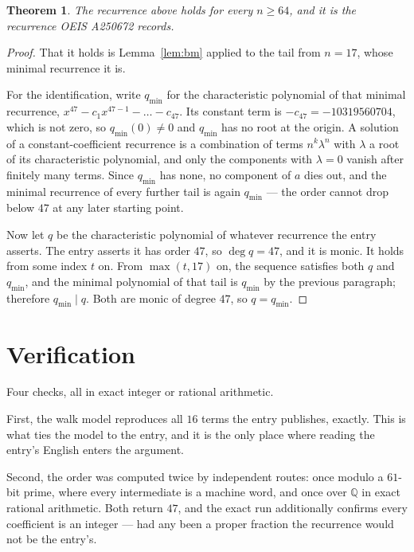 \documentclass[11pt,a4paper]{article}
\theoremstyle{plain}
\newtheorem{theorem}{Theorem}
\theoremstyle{definition}
\begin{document}
\begin{theorem}
The recurrence above holds for every $n\ge64$, and it is the recurrence OEIS A250672 records.
\end{theorem}

\begin{proof}
That it holds is Lemma~\ref{lem:bm} applied to the tail from $n=17$, whose minimal
recurrence it is.

For the identification, write $q_{\min}$ for the characteristic polynomial of that minimal
recurrence, $x^{47}-c_1x^{47-1}-\dots-c_{47}$. Its constant term is
$-c_{47}=-10319560704$, which is not zero, so $q_{\min}(0)\neq0$ and $q_{\min}$ has no
root at the origin. A solution of a constant-coefficient recurrence is a combination of terms
$n^{k}\lambda^{n}$ with $\lambda$ a root of its characteristic polynomial, and only the
components with $\lambda=0$ vanish after finitely many terms. Since $q_{\min}$ has none, no
component of $a$ dies out, and the minimal recurrence of every further tail is again
$q_{\min}$ --- the order cannot drop below $47$ at any later starting point.

Now let $q$ be the characteristic polynomial of whatever recurrence the entry asserts. The
entry asserts it has order $47$, so $\deg q=47$, and it is monic. It holds from some
index $t$ on. From $\max(t,17)$ on, the sequence satisfies both $q$ and $q_{\min}$, and
the minimal polynomial of that tail is $q_{\min}$ by the previous paragraph; therefore
$q_{\min}\mid q$. Both are monic of degree $47$, so $q=q_{\min}$.
\end{proof}

\section{Verification}

Four checks, all in exact integer or rational arithmetic.

First, the walk model reproduces all $16$ terms the entry publishes, exactly. This is
what ties the model to the entry, and it is the only place where reading the entry's English
enters the argument.

Second, the order was computed twice by independent routes: once modulo a $61$-bit prime, where
every intermediate is a machine word, and once over $\mathbb{Q}$ in exact rational arithmetic.
Both return $47$, and the exact run additionally confirms every coefficient is an integer
--- had any been a proper fraction the recurrence would not be the entry's.
\end{document}
